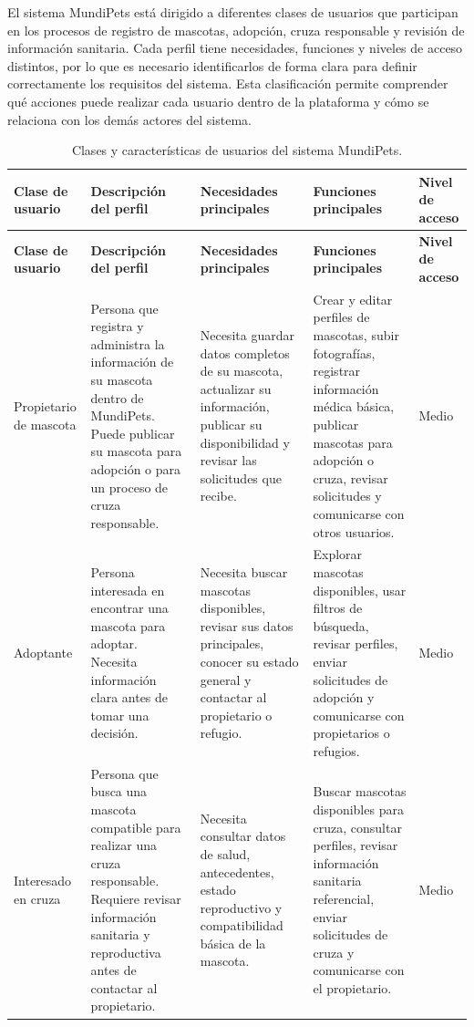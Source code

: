 \documentclass[journal,onecolumn]{IEEEtran}
\begin{document}
	El sistema MundiPets está dirigido a diferentes clases de usuarios que
	participan en los procesos de registro de mascotas, adopción, cruza
	responsable y revisión de información sanitaria. Cada perfil tiene
	necesidades, funciones y niveles de acceso distintos, por lo que es necesario
	identificarlos de forma clara para definir correctamente los requisitos del
	sistema. Esta clasificación permite comprender qué acciones puede realizar
	cada usuario dentro de la plataforma y cómo se relaciona con los demás actores
	del sistema.
	
	\begin{longtable}{|p{2.2cm}|p{3.4cm}|p{3.4cm}|p{3.7cm}|p{1.2cm}|}
		\caption{Clases y características de usuarios del sistema MundiPets.} \label{tab:clases_usuario} \\
		\hline
		\textbf{Clase de usuario} & \textbf{Descripción del perfil} & \textbf{Necesidades principales} & \textbf{Funciones principales} & \textbf{Nivel de acceso} \\
		\hline
		\endfirsthead
		\hline
		\textbf{Clase de usuario} & \textbf{Descripción del perfil} & \textbf{Necesidades principales} & \textbf{Funciones principales} & \textbf{Nivel de acceso} \\
		\hline
		\endhead
		\hline
		\endfoot
		\hline
		\endlastfoot
		
		Propietario de mascota & Persona que registra y administra la información de su mascota dentro de MundiPets. Puede publicar su mascota para adopción o para un proceso de cruza responsable. & Necesita guardar datos completos de su mascota, actualizar su información, publicar su disponibilidad y revisar las solicitudes que recibe. & Crear y editar perfiles de mascotas, subir fotografías, registrar información médica básica, publicar mascotas para adopción o cruza, revisar solicitudes y comunicarse con otros usuarios. & Medio \\ \hline
		
		Adoptante & Persona interesada en encontrar una mascota para adoptar. Necesita información clara antes de tomar una decisión. & Necesita buscar mascotas disponibles, revisar sus datos principales, conocer su estado general y contactar al propietario o refugio. & Explorar mascotas disponibles, usar filtros de búsqueda, revisar perfiles, enviar solicitudes de adopción y comunicarse con propietarios o refugios. & Medio \\ \hline
		
		Interesado en cruza & Persona que busca una mascota compatible para realizar una cruza responsable. Requiere revisar información sanitaria y reproductiva antes de contactar al propietario. & Necesita consultar datos de salud, antecedentes, estado reproductivo y compatibilidad básica de la mascota. & Buscar mascotas disponibles para cruza, consultar perfiles, revisar información sanitaria referencial, enviar solicitudes de cruza y comunicarse con el propietario. & Medio \\ \hline
		

\end{longtable}
\end{document}
